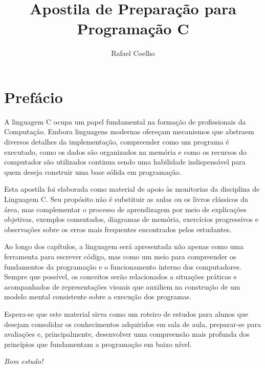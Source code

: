 \documentclass[12pt,a4paper,oneside]{extreport}
\title{\huge Apostila de Preparação para Programação \textbf{C}}
\author{Rafael Coelho}
\begin{document}
\maketitle



\chapter*{Prefácio}

A linguagem C ocupa um papel fundamental na formação de profissionais da Computação. Embora linguagens modernas ofereçam mecanismos que abstraem diversos detalhes da implementação, compreender como um programa é executado, como os dados são organizados na memória e como os recursos do computador são utilizados continua sendo uma habilidade indispensável para quem deseja construir uma base sólida em programação.

Esta apostila foi elaborada como material de apoio às monitorias da disciplina de Linguagem C. Seu propósito não é substituir as aulas ou os livros clássicos da área, mas complementar o processo de aprendizagem por meio de explicações objetivas, exemplos comentados, diagramas de memória, exercícios progressivos e observações sobre os erros mais frequentes encontrados pelos estudantes.

Ao longo dos capítulos, a linguagem será apresentada não apenas como uma ferramenta para escrever código, mas como um meio para compreender os fundamentos da programação e o funcionamento interno dos computadores. Sempre que possível, os conceitos serão relacionados a situações práticas e acompanhados de representações visuais que auxiliem na construção de um modelo mental consistente sobre a execução dos programas.

Espera-se que este material sirva como um roteiro de estudos para alunos que desejam consolidar os conhecimentos adquiridos em sala de aula, preparar-se para avaliações e, principalmente, desenvolver uma compreensão mais profunda dos princípios que fundamentam a programação em baixo nível.

\vspace{1cm}

\begin{flushright}
\textit{Bom estudo!}
\end{flushright}

\end{document}
